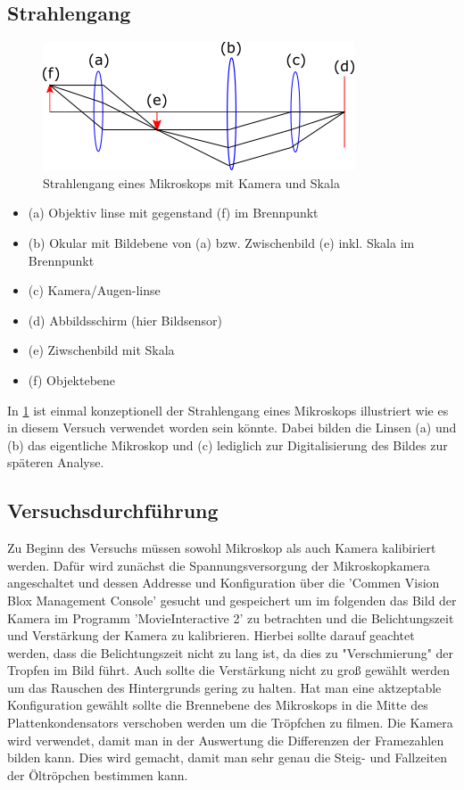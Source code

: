 \documentclass{scrartcl}
\begin{document}
	\subsection{Strahlengang}
		\begin{figure}[H]
            \centering
            \includegraphics[width=.5\textwidth]{mikroskop.png} 
			\caption{Strahlengang eines Mikroskops mit Kamera und Skala}
			\label{Mikroskop}  
        \end{figure}
        \begin{itemize}
            \item (a) Objektiv linse mit gegenstand (f) im Brennpunkt
            \item (b) Okular mit Bildebene von (a) bzw. Zwischenbild (e) inkl. Skala im Brennpunkt
            \item (c) Kamera/Augen-linse
            \item (d) Abbildsschirm (hier Bildsensor)
            \item (e) Ziwschenbild mit Skala
            \item (f) Objektebene
        \end{itemize}
        In \ref{Mikroskop} ist einmal konzeptionell der Strahlengang eines Mikroskops illustriert wie es in diesem
        Versuch verwendet worden sein könnte. Dabei bilden die Linsen (a) und (b) das eigentliche Mikroskop und (c)
        lediglich zur Digitalisierung des Bildes zur späteren Analyse.

	\subsection{Versuchsdurchführung}
		Zu Beginn des Versuchs müssen sowohl Mikroskop als auch Kamera kalibiriert werden. Dafür wird zunächst die
		Spannungsversorgung der Mikroskopkamera angeschaltet und dessen Addresse und Konfiguration über die 'Commen Vision Blox Management Console'
		gesucht und gespeichert um im folgenden das Bild der Kamera im Programm 'MovieInteractive 2' zu betrachten
		und die Belichtungszeit und Verstärkung der Kamera zu kalibrieren. Hierbei sollte darauf geachtet werden, dass die 
		Belichtungszeit nicht zu lang ist, da dies zu "Verschmierung" der Tropfen im Bild führt. Auch sollte 
		die Verstärkung nicht zu groß gewählt werden um das Rauschen des Hintergrunds gering zu halten. Hat man 
		eine aktzeptable Konfiguration gewählt sollte die Brennebene des Mikroskops in die Mitte des Plattenkondensators
		verschoben werden um die Tröpfchen zu filmen. Die Kamera wird verwendet, damit man in der Auswertung die Differenzen
        der Framezahlen bilden kann. Dies wird gemacht, damit man sehr genau die Steig- und Fallzeiten der Öltröpchen bestimmen kann.
\end{document}
